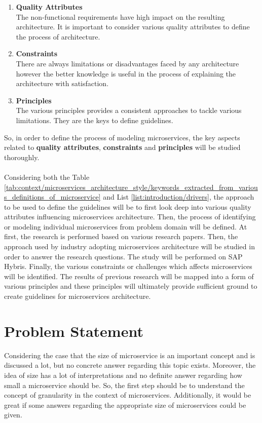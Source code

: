 \label{list:introduction/drivers}
\begin{enumerate}
\item \textbf{Quality Attributes}\\
The non-functional requirements have high impact on the resulting architecture. It is important to consider various quality attributes to define the process of architecture.
\item \textbf{Constraints}\\
There are always limitations or disadvantages faced by any architecture however the better knowledge is useful in the process of explaining the architecture with satisfaction.
\item \textbf{Principles}\\
The various principles provides a consistent approaches to tackle various limitations. They are the keys to define guidelines.
\end{enumerate}
So, in order to define the process of modeling microservices, the key aspects related to \textbf{quality attributes}, \textbf{constraints} and \textbf{principles} will be studied thoroughly.
\\
\\
Considering both the Table \ref{tab:context/microservices_architecture_style/keywords_extracted_from_various_definitions_of_microservice} and List \ref{list:introduction/drivers}, the approach to be used to define the guidelines will be to first look deep into various quality attributes influencing microservices architecture. Then, the process of identifying or modeling individual microservices from problem domain will be defined. At first, the research is performed based on various research papers. Then, the approach used by industry adopting microservices architecture will be studied in order to answer the research questions. The study will be performed on SAP Hybris.
Finally, the various constraints or challenges which affects microservices will be identified. 
The results of previous research will be mapped into a form of various principles and these principles will ultimately provide sufficient ground to create guidelines for microservices architecture.

\section{Problem Statement}\label{section:context/problem_statement}
Considering the case that the size of microservice is an important concept and is discussed a lot, but no concrete answer regarding this topic exists. Moreover, the idea of size has a lot of interpretations and no definite answer regarding how small a microservice should be. So, the first step should be to understand the concept of granularity in the context of microservices. Additionally, it would be great if some answers regarding the appropriate size of microservices could be given.
